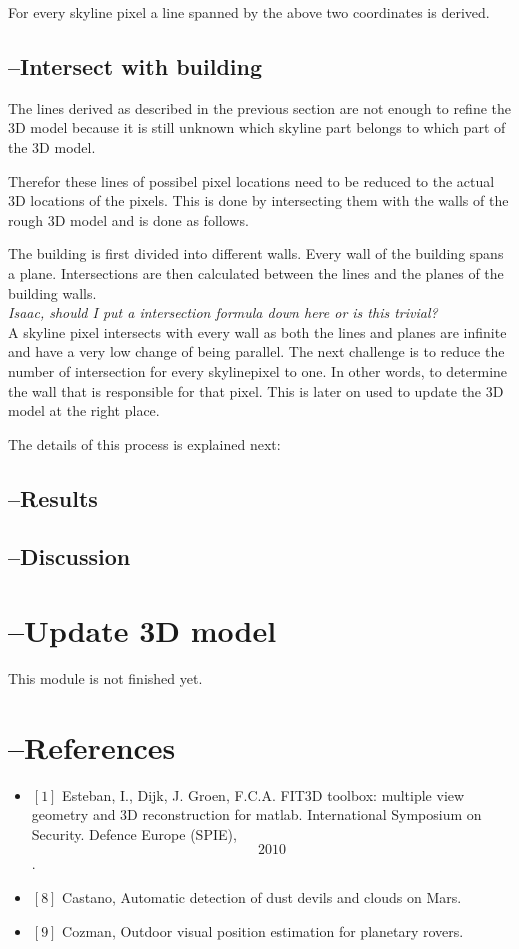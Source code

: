 \documentclass[10pt]{article}
\begin{document}
For every skyline pixel a line spanned by the above two coordinates is derived.


\subsection{--Intersect with building}
The lines derived as described in the previous section are not enough to refine
the 3D model because it is still unknown which skyline part belongs to which
part of the 3D model.

Therefor these lines of possibel pixel locations need to
be reduced to the actual 3D locations of the pixels.  This is done by intersecting
them with the walls of the rough 3D model and is done as follows.

The building is first divided into different walls.  Every wall of the building spans a plane. 
Intersections are then calculated between the lines and the planes of the building walls.\\
\textit{Isaac, should I put a intersection formula down here or is this trivial?}\\

A skyline pixel intersects with every wall as both the lines and planes are
infinite and have a very low change of being parallel.
The next challenge is to reduce the number of intersection for every skylinepixel
to one. In other words, to determine the wall that is responsible for that pixel. 
This is later on used to update the 3D model at the right place.

The details of this process is explained next:

\subsection{--Results}


\subsection{--Discussion}

\section{--Update 3D model}
This module is not finished yet.


\section{--References}
\begin{itemize}
\item $[1]$ 
Esteban, I., Dijk, J. Groen, F.C.A. FIT3D toolbox: multiple view geometry and
3D reconstruction for matlab. International Symposium on Security. Defence
Europe (SPIE), \[2010\].
\item $[8]$ Castano, Automatic detection of dust devils and clouds on Mars.
\item $[9]$ Cozman, Outdoor visual position estimation for planetary rovers.
\end{itemize}
\end{document}
